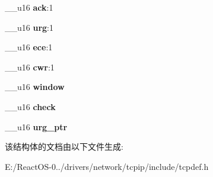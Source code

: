 \begin{DoxyCompactItemize}
\mbox{\label{structtcphdr_ab395ea0c4ea8f7e3c2553a7e3160d781}} 
\+\_\+\+\_\+u16 {\bfseries ack}\+:1
\item 
\mbox{\label{structtcphdr_a2661081410fb8c75e36e8c0b6c7b58ef}} 
\+\_\+\+\_\+u16 {\bfseries urg}\+:1
\item 
\mbox{\label{structtcphdr_a67e28517a7e01f298d7ec36b36ea2a01}} 
\+\_\+\+\_\+u16 {\bfseries ece}\+:1
\item 
\mbox{\label{structtcphdr_ad29132cd0df148d6834f7becb7aceb8b}} 
\+\_\+\+\_\+u16 {\bfseries cwr}\+:1
\item 
\mbox{\label{structtcphdr_a3bb3d1a88730d6eca5fcc183c005121e}} 
\+\_\+\+\_\+u16 {\bfseries window}
\item 
\mbox{\label{structtcphdr_aa746e83e862d24c8ea9ae4a66a17ab15}} 
\+\_\+\+\_\+u16 {\bfseries check}
\item 
\mbox{\label{structtcphdr_a537c51f9831cccd151ec518c8e41834a}} 
\+\_\+\+\_\+u16 {\bfseries urg\+\_\+ptr}
\end{DoxyCompactItemize}


该结构体的文档由以下文件生成\+:\begin{DoxyCompactItemize}
\item 
E\+:/\+React\+O\+S-\/0../drivers/network/tcpip/include/tcpdef.\+h\end{DoxyCompactItemize}
